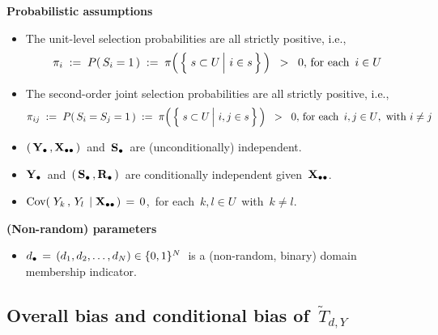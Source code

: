 \vskip 0.2cm
\noindent
\textbf{Probabilistic assumptions}
\begin{itemize}
\item
    The unit-level selection probabilities are all strictly positive, i.e.,
    \begin{equation*}
    \pi_{i}
    \; := \;
        P(\,S_{i} = 1\,)
    \; := \;
        \pi\!\left(\,\left\{\,
            \left.
            s \overset{{\color{white}.}}{\subset} U
            \,\right\vert\,
            i \in s
            \,\right\}
        \,\right)
    \;\; > \;\;
        0,\,
    \textnormal{for each \,$i \in U$\,
    }
    \end{equation*}
\item
    The second-order joint selection probabilities are all strictly positive, i.e.,
    \begin{equation*}
    \pi_{ij}
    \; := \;
        P(\,S_{i} = S_{j} = 1\,)
    \; := \;
        \pi\!\left(\,\left\{\,
            \left.
            s \overset{{\color{white}.}}{\subset} U
            \,\right\vert\,
            i, j \in s
            \,\right\}
        \,\right)
    \;\; > \;\;
        0,\,
    \textnormal{for each \,$i,j \in U$,\, with $i \neq j$}
    \end{equation*}
\item
    $\left(\,\mathbf{Y}_{\bullet}\,,\mathbf{X}_{\bullet\bullet}\,\right)$\, and \,$\mathbf{S}_{\bullet}$\, are (unconditionally) independent.
\item
    $\mathbf{Y}_{\bullet}$\, and \,$(\,\mathbf{S}_{\bullet}\,,\mathbf{R}_{\bullet}\,)$\, are {\color{red}conditionally independent} given \,$\mathbf{X}_{\bullet\bullet}$.
\item
    $\textnormal{Cov}\!\left(\;Y_{k}\,,\,Y_{l}\;\left\vert\;\mathbf{X}_{\bullet\bullet}\right.\right) \,=\, 0$,\,
    for each \,$k, l \in U$\, with \,$k \neq l$.
\end{itemize}

\vskip 0.2cm
\noindent
\textbf{(Non-random) parameters}
\begin{itemize}
\item
    $d_{\bullet} \,=\, (d_{1},d_{2},\ldots,d_{N}) \in \{0,1\}^{N}$\,
    is a (non-random, binary) domain membership indicator.
\end{itemize}


\vskip 1.0cm
\subsection{Overall bias and conditional bias of \,$\widetilde{T}_{d,Y}$}
\setcounter{theorem}{0}

